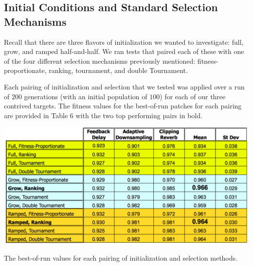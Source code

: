 \documentclass[12pt]{report} 	%
\numberwithin{figure}{chapter}
\numberwithin{table}{chapter}
\numberwithin{equation}{chapter}
\begin{document}
\begin{flushleft}
\subsection{Initial Conditions and Standard Selection Mechanisms}

Recall that there are three flavors of initialization we wanted to investigate: full, grow, and ramped half-and-half. We ran tests that paired each of these with one of the four different selection mechanisms previously mentioned: fitness-proportionate, ranking, tournament, and double Tournament.

Each pairing of initialization and selection that we tested was applied over a run of $200$ generations (with an initial population of $100$) for each of our three contrived targets. The fitness values for the best-of-run patches for each pairing are provided in Table 6 with the two top performing pairs in bold.
\begin{table}[h!]
\begin{center}
\includegraphics[scale=0.6,width=\linewidth]{InitializationTable1}
\caption[Initialization and selection best-of-run values]{The best-of-run values for each pairing of initialization and selection methods.}
\end{center}
\end{table}


\end{flushleft}
\end{document}
